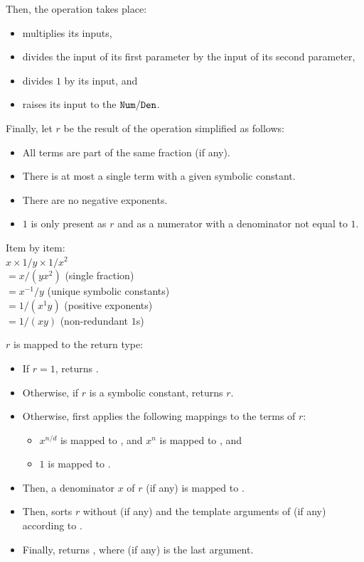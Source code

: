 \begin{itemdescr}
\pnum
Then, the operation takes place:
\begin{itemize}
\item
{} multiplies its inputs,
\item
{} divides the input of its first parameter by the input of its second parameter,
\item
{} divides $1$ by its input, and
\item
{} raises its input to the $\texttt{\protect Num}/\texttt{\protect Den}$.
\end{itemize}

\pnum
Finally, let $r$ be the result of the operation simplified as follows:
\begin{itemize}
\item
All terms are part of the same fraction (if any).
\item
There is at most a single term with a given symbolic constant.
\item
There are no negative exponents.
\item
$1$ is only present as $r$ and as a numerator with a denominator not equal to $1$.
\end{itemize}
\begin{example}
Item by item: \\
$x \times 1/y \times 1/x^2$ \\
$= x/(y x^2)$ (single fraction) \\
$= x^{-1}/y$ (unique symbolic constants) \\
$= 1/(x^1 y)$ (positive exponents) \\
$= 1/(xy)$ (non-redundant $1$s) \\
\end{example}

\pnum
\returns
$r$ is mapped to the return type:
\begin{itemize}
\item
If $r = 1$, returns .
\item
Otherwise, if $r$ is a symbolic constant, returns $r$.
\item
Otherwise, first applies the following mappings to the terms of $r$:
\begin{itemize}
\item
$x^{n/d}$ is mapped to , and
$x^{n}$ is mapped to , and
\item
$1$ is mapped to .
\end{itemize}
\item
Then, a denominator $x$ of $r$ (if any) is mapped to .
\item
Then, sorts $r$ without  (if any) and
the template arguments of  (if any)
according to .
\item
Finally, returns , where  (if any) is the last argument.
\end{itemize}


\end{itemdescr}
